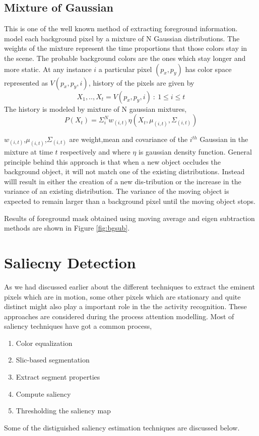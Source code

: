 \documentclass[MTech]{iitmdiss}
\begin{document}
\section{Mixture of Gaussian}
This is one of the well known method of extracting foreground information. \cite{kaew} model each background pixel by a mixture of N Gaussian distributions. The weights of the mixture represent the time proportions that those colors stay in the scene. The probable background colors are the ones which stay longer and more static. At any instance $i$ a particular pixel $(p_x,p_y)$ has color space represented as $V(p_{x},p_{y},i)$, history of the pixels are given by 
$$X_{1},..,X_{t} = {V(p_{x},p_{y},i)~:~1\le i \le t }$$
The history is modeled by mixture of N gaussian mixtures,
$$P(X_{t})=\Sigma_{i}^{N}w_{(i,t)}\eta(X_{t},\mu_{(i,t)},\Sigma_{(i,t)})$$
\par $w_{(i,t)}$,$\mu_{(i,t)}$,$\Sigma_{(i,t)}$ are weight,mean and covariance of the $i^{th}$ Gaussian in the mixture at time $t$ respectively and where $\eta$ is gaussian density function. General principle behind this approach is that when a new object occludes the background object, it will not match one of the existing distributions. Instead willl result in either the creation of a new dis-tribution or the increase in the variance of an existing distribution. The variance of the moving object is expected to remain larger than a background pixel until the moving object stops.

\par Results of foreground mask obtained using moving average and eigen subtraction methods are shown in Figure \ref{fig:bgsub}.
\chapter{Saliecny Detection}
As we had discussed earlier about the different techniques to extract the eminent pixels which are in motion, some other pixels which are stationary and quite distinct might also play a important role in the the activity recognition. These approaches are considered during the process attention modelling. Most of saliency techniques have got  a common process,
\begin{enumerate}
	\item{Color equalization}
	\item{Slic-based segmentation}
	\item{Extract segment properties}
	\item{Compute saliency}
	\item{Thresholding the saliency map}
\end{enumerate} 
\par Some of the distiguished saliency estimation techniques are discussed below. 
\end{document}
